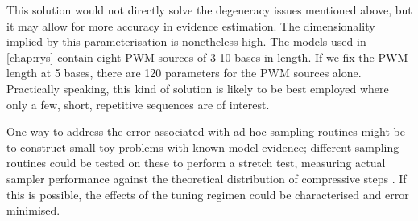 This solution would not directly solve the degeneracy issues mentioned above, but it may allow for more accuracy in evidence estimation. The dimensionality implied by this parameterisation is nonetheless high. The models used in \autoref{chap:rys} contain eight PWM sources of 3-10 bases in length. If we fix the PWM length at 5 bases, there are 120 parameters for the PWM sources alone. Practically speaking, this kind of solution is likely to be best employed where only a few, short, repetitive sequences are of interest.

One way to address the error associated with ad hoc sampling routines might be to construct small toy problems with known model evidence; different sampling routines could be tested on these to perform a stretch test, measuring actual sampler performance against the theoretical distribution of compressive steps \cite{Buchner2016}. If this is possible, the effects of the  tuning regimen could be characterised and error minimised.